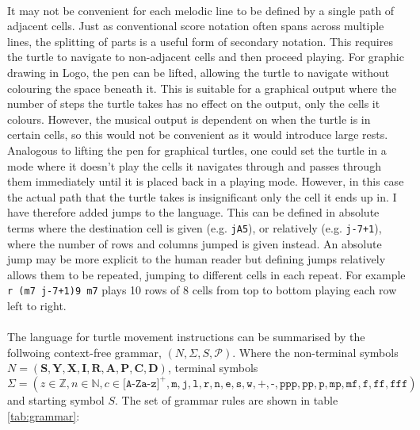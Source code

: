 \paragraph{} It may not be convenient for each melodic line to be defined by a single path of adjacent cells. Just as conventional score notation often spans across multiple lines, the splitting of parts is a useful form of secondary notation. This requires the turtle to navigate to non-adjacent cells and then proceed playing. For graphic drawing in Logo, the pen can be lifted, allowing the turtle to navigate without colouring the space beneath it. This is suitable for a graphical output where the number of steps the turtle takes has no effect on the output, only the cells it colours. However, the musical output is dependent on when the turtle is in certain cells, so this would not be convenient as it would introduce large rests. Analogous to lifting the pen for graphical turtles, one could set the turtle in a mode where it doesn't play the cells it navigates through and passes through them immediately until it is placed back in a playing mode. However, in this case the actual path that the turtle takes is insignificant only the cell it ends up in. I have therefore added jumps to the language. This can be defined in absolute terms where the destination cell is given (e.g. \texttt{jA5}), or relatively (e.g. \texttt{j-7+1}), where the number of rows and columns jumped is given instead. An absolute jump may be more explicit to the human reader but defining jumps relatively allows them to be repeated, jumping to different cells in each repeat. For example \texttt{r (m7 j-7+1)9 m7} plays 10 rows of 8 cells from top to bottom playing each row left to right.

\paragraph{} The language for turtle movement instructions can be summarised by the follwoing context-free grammar, $(N,\Sigma,S,\mathcal{P})$. Where the non-terminal symbols $N=(\mathbf{S}, \mathbf{Y}, \mathbf{X}, \mathbf{I}, \mathbf{R}, \mathbf{A}, \mathbf{P}, \mathbf{C}, \mathbf{D})$, terminal symbols $\Sigma=(z{\in}\mathbb{Z}, n{\in}\mathbb{N}, c{\in}\texttt{[A-Za-z]}^{+}, \texttt{m}, \texttt{j}, \texttt{l}, \texttt{r}, \texttt{n}, \texttt{e}, \texttt{s}, \texttt{w}, \texttt{+}, \texttt{-}, \texttt{ppp}, \texttt{pp}, \texttt{p}, \texttt{mp}, \texttt{mf}, \texttt{f}, \texttt{ff}, \texttt{fff})$ and starting symbol $S$. The set of grammar rules are shown in table \ref{tab:grammar}:

